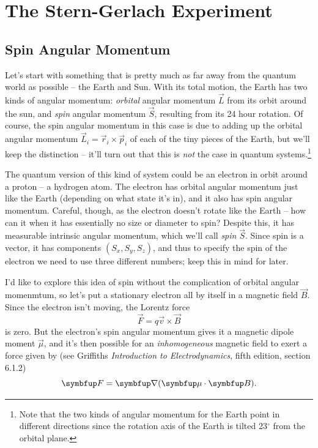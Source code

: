\chapter{The Stern-Gerlach Experiment}

\section{Spin Angular Momentum}

Let's start with something that is pretty much as far away from the quantum world as possible -- the Earth and Sun.  With its total motion, the Earth has two kinds of angular momentum:  \emph{orbital} angular momentum $\vec{L}$ from its orbit around the sun, and \emph{spin} angular momentum $\vec{S}$, resulting from its 24 hour rotation.  Of course, the spin angular momentum in this case is due to adding up the orbital angular momentum $\vec{L}_i = \vec{r}_i \times \vec{p}_i$ of each of the tiny pieces of the Earth, but we'll keep the distinction -- it'll turn out that this is \emph{not} the case in quantum systems.\footnote{Note that the two kinds of angular momentum for the Earth point in different directions since the rotation axis of the Earth is tilted 23$^\circ$ from the orbital plane.}

The quantum version of this kind of system could be an electron in orbit around a proton -- a hydrogen atom.  The electron has orbital angular momentum just like the Earth (depending on what state it's in), and it also has spin angular momentum.  Careful, though, as the electron doesn't rotate like the Earth -- how can it when it has essentially no size or diameter to spin?  Despite this, it has measurable intrinsic angular momentum, which we'll call \emph{spin} $\vec{S}$.  Since spin is a vector, it has components $(S_x, S_y, S_z)$, and thus to specify the spin of the electron we need to use three different numbers; keep this in mind for later.

I'd like to explore this idea of spin without the complication of orbital angular momenmtum, so let's put a stationary electron all by itself in a magnetic field $\vec{B}$.  Since the electron isn't moving, the Lorentz force
\[
\vec{F} = q\vec{v} \times \vec{B}
\]
is zero.  But the electron's spin angular momentum gives it a magnetic dipole moment $\vec{\mu}$, and it's then possible for an \emph{inhomogeneous} magnetic field to exert a force given by (see Griffiths \emph{Introduction to Electrodynamics}, fifth edition, section 6.1.2)
\begin{equation}
\vec{F} = \grad (\vec{\mu} \cdot \vec{B}).
\label{eq_force_inhomo}
\end{equation}

